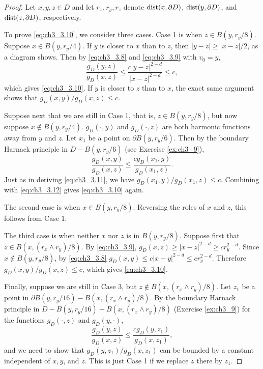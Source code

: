 \begin{proof}
Let $x,y,z \in D$ and let $r_x,r_y,r_z$ denote $\operatorname{dist}(x,\partial D)$, $\operatorname{dist}(y,\partial D)$, and $\operatorname{dist}(z,\partial D)$, respectively.

To prove \eqref{eq:ch3_3.10}, we consider three cases. Case 1 is when $z \in B(y,r_y/8)$. Suppose $x \in B(y,r_y/4)$. If $y$ is closer to $x$ than to $z$, then $|y-z| \geq |x-z|/2$, as a diagram shows. Then by \eqref{eq:ch3_3.8} and \eqref{eq:ch3_3.9} with $v_0 = y$,
\begin{equation}\label{eq:ch3_3.11}
    \frac{g_D(y,z)}{g_D(x,z)} \leq \frac{c|y-z|^{2-d}}{|x-z|^{2-d}} \leq c,
\end{equation}
which gives \eqref{eq:ch3_3.10}. If $y$ is closer to $z$ than to $x$, the exact same argument shows that $g_D(x,y)/g_D(x,z) \leq c$.

Suppose next that we are still in Case 1, that is, $z \in B(y,r_y/8)$, but now suppose $x \notin B(y,r_y/4)$. $g_D(\cdot,y)$ and $g_D(\cdot,z)$ are both harmonic functions away from $y$ and $z$. Let $x_1$ be a point on $\partial B(y,r_y/6)$. Then by the boundary Harnack principle in $D - B(y,r_y/6)$ (see Exercise \ref{ex:ch3_9}),
\begin{equation}\label{eq:ch3_3.12}
\frac{g_D(x,y)}{g_D(x,z)} \leq \frac{cg_D(x_1,y)}{g_D(x_1,z)}.
\end{equation}
Just as in deriving \eqref{eq:ch3_3.11}, we have $g_D(x_1,y)/g_D(x_1,z) \leq c$. Combining with \eqref{eq:ch3_3.12} gives \eqref{eq:ch3_3.10} again.

The second case is when $x \in B(y,r_y/8)$. Reversing the roles of $x$ and $z$, this follows from Case 1.

The third case is when neither $x$ nor $z$ is in $B(y,r_y/8)$. Suppose first that $z \in B(x,(r_x \wedge r_y)/8)$. By \eqref{eq:ch3_3.9}, $g_D(x,z) \geq |x-z|^{2-d} \geq cr_y^{2-d}$. Since $x \notin B(y,r_y/8)$, by \eqref{eq:ch3_3.8} $g_D(x,y) \leq c|x-y|^{2-d} \leq cr_y^{2-d}$. Therefore $g_D(x,y)/g_D(x,z) \leq c$, which gives \eqref{eq:ch3_3.10}.

Finally, suppose we are still in Case 3, but $z \notin B(x,(r_x \wedge r_y)/8)$. Let $z_1$ be a point in $\partial B(y,r_y/16) - B(x,(r_x \wedge r_y)/8)$. By the boundary Harnack principle in $D - B(y,r_y/16) - B(x,(r_x \wedge r_y)/8)$ (Exercise \ref{ex:ch3_9}) for the functions $g_D(\cdot,z)$ and $g_D(y,\cdot)$,
\[
    \frac{g_D(y,z)}{g_D(x,z)} \leq \frac{cg_D(y,z_1)}{g_D(x,z_1)},
\]
and we need to show that $g_D(y,z_1)/g_D(x,z_1)$ can be bounded by a constant independent of $x,y$, and $z$. This is just Case 1 if we replace $z$ there by $z_1$.
\end{proof}

